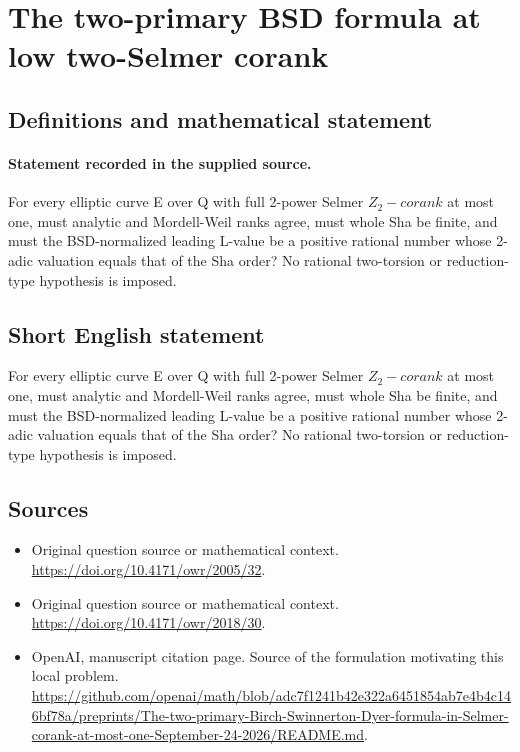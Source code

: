 \documentclass[11pt]{article}
\begin{document}
\section*{The two-primary BSD formula at low two-Selmer corank}\label{30007286}
\subsection{Definitions and mathematical statement}
\paragraph{Statement recorded in the supplied source.}
For every elliptic curve E over Q with full 2-power Selmer $Z_2-corank$ at most one, must analytic and Mordell-Weil ranks agree, must whole Sha be finite, and must the BSD-normalized leading L-value be a positive rational number whose 2-adic valuation equals that of the Sha order? No rational two-torsion or reduction-type hypothesis is imposed.
\subsection{Short English statement}
For every elliptic curve E over Q with full 2-power Selmer $Z_2-corank$ at most one, must analytic and Mordell-Weil ranks agree, must whole Sha be finite, and must the BSD-normalized leading L-value be a positive rational number whose 2-adic valuation equals that of the Sha order? No rational two-torsion or reduction-type hypothesis is imposed.
\subsection{Sources}
\begin{itemize}
\item[S1] Original question source or mathematical context.
\url{https://doi.org/10.4171/owr/2005/32}.
\item[S2] Original question source or mathematical context.
\url{https://doi.org/10.4171/owr/2018/30}.
\item[S3] OpenAI, manuscript citation page. Source of the formulation motivating this local problem.
\url{https://github.com/openai/math/blob/adc7f1241b42e322a6451854ab7e4b4c146bf78a/preprints/The-two-primary-Birch-Swinnerton-Dyer-formula-in-Selmer-corank-at-most-one-September-24-2026/README.md}.
\end{itemize}
\end{document}
